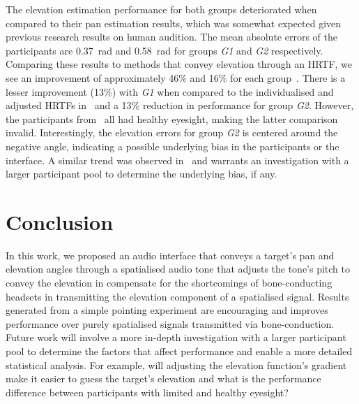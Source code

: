 \documentclass{llncs}
\begin{document}
The elevation estimation performance for both groups deteriorated when compared to their pan estimation results, which was somewhat expected given previous research results on human audition. 
The mean absolute errors of the participants are \SI{0.37}{\radian} and \SI{0.58}{\radian} for groups \textit{G1} and \textit{G2} respectively.
Comparing these results to methods that convey elevation through an HRTF, we see an improvement of approximately 46\% and 16\% for each group~\cite{schonstein2008comparison}. 
There is a lesser improvement (13\%) with \textit{G1} when compared to the individualised and adjusted HRTFs in~\cite{stanley2006lateralization} and a 13\% reduction in performance for group \textit{G2}.
However, the participants from~\cite{stanley2006lateralization} all had healthy eyesight, making the latter comparison invalid. 
Interestingly, the elevation errors for group \textit{G2} is centered around the negative angle, indicating a possible underlying bias in the participants or the interface.
A similar trend was observed in~\cite{stanley2006lateralization} and warrants an investigation with a larger participant pool to determine the underlying bias, if any. 

\section{Conclusion}

In this work, we proposed an audio interface that conveys a target's pan and elevation angles through a spatialised audio tone that adjusts the tone's pitch to convey the elevation in compensate for the shortcomings of bone-conducting headsets in transmitting the elevation component of a spatialised signal.
Results generated from a simple pointing experiment are encouraging and improves performance over purely spatialised signals transmitted via bone-conduction.
Future work will involve a more in-depth investigation with a larger participant pool to determine the factors that affect performance and enable a more detailed statistical analysis.
For example, will adjusting the elevation function's gradient make it easier to guess the target's elevation and what is the performance difference between participants with limited and healthy eyesight?  

\end{document}
